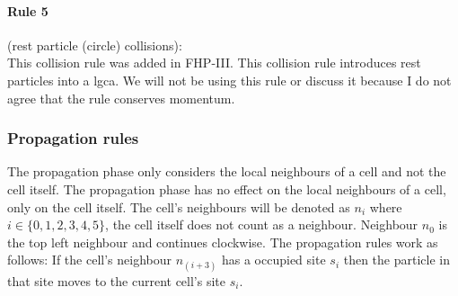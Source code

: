 \documentclass[a4paper,12pt]{article}
\begin{document}
\paragraph{Rule 5}(rest particle (circle) collisions):\\
This collision rule was added in FHP-III.
This collision rule introduces rest particles into
a \acrshort{lgca}. We will not be using this rule or discuss it because I do not agree that the rule conserves momentum.
\subsubsection{Propagation rules}
The propagation phase only considers the local neighbours of a cell and not the cell itself. The propagation phase has no effect on the local neighbours of a cell, only on the cell itself. The cell's neighbours will be denoted as $n_i$ where $i \in \{0, 1, 2, 3, 4, 5\}$, the cell itself does not count as a neighbour. Neighbour $n_0$ is the top left neighbour and continues clockwise. The propagation rules work as follows: If the cell's neighbour $n_{(i + 3)}$ has a occupied site $s_{i}$ then the particle in that site moves to the current cell's
site $s_{i}$.
\end{document}
